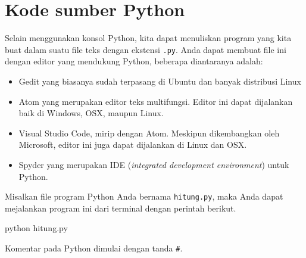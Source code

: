 \section{Kode sumber Python}

Selain menggunakan konsol Python, kita dapat menuliskan program
yang kita buat dalam suatu file teks dengan ekstensi \texttt{.py}.
Anda dapat membuat file ini dengan editor yang mendukung Python, beberapa
diantaranya adalah:
\begin{itemize}
\item \textsf{Gedit} yang biasanya sudah terpasang di Ubuntu dan banyak distribusi
Linux
\item \textsf{Atom} yang merupakan editor teks multifungsi. Editor ini dapat
dijalankan baik di Windows, OSX, maupun Linux.
\item \textsf{Visual Studio Code}, mirip dengan \textsf{Atom}.
Meskipun dikembangkan oleh Microsoft, editor ini juga dapat dijalankan di Linux dan
OSX.
\item \textsf{Spyder} yang merupakan IDE (\textit{integrated development environment}) untuk
Python.
\end{itemize}

Misalkan file program Python Anda bernama \texttt{hitung.py}, maka Anda dapat
mejalankan program ini dari terminal dengan perintah berikut.
\begin{textcode}
python hitung.py
\end{textcode}

Komentar pada Python dimulai dengan tanda \verb|#|.